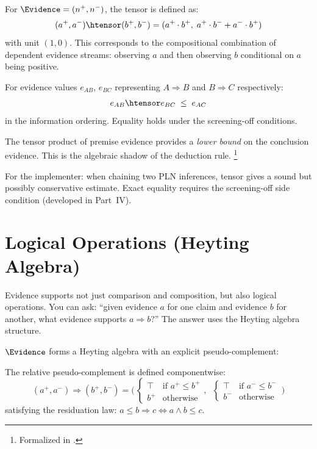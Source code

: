 \documentclass[11pt,openany]{report}
\begin{document}
For $\Evidence = (n^+, n^-)$, the tensor is defined as:
\[
  (a^+, a^-) \htensor (b^+, b^-) = (a^+ \cdot b^+,\; a^+ \cdot b^- + a^- \cdot b^+)
\]
with unit $(1, 0)$.  This corresponds to the compositional combination of
dependent evidence streams: observing $a$ and then observing $b$ conditional
on $a$ being positive.

\begin{theorem}
\label{thm:quantale-trans}
For evidence values $e_{AB}$, $e_{BC}$ representing
$A \Rightarrow B$ and $B \Rightarrow C$ respectively:
\[
  e_{AB} \htensor e_{BC} \;\le\; e_{AC}
\]
in the information ordering.  Equality holds under the screening-off
conditions.
\end{theorem}

\noindent
The tensor product of premise evidence provides a \emph{lower bound} on the
conclusion evidence.  This is the algebraic shadow of the deduction rule.%
\footnote{Formalized in .}

For the implementer: when chaining two PLN inferences, tensor gives a
sound but possibly conservative estimate.  Exact equality requires the
screening-off side condition (developed in Part~IV).

\section{Logical Operations (Heyting Algebra)}

Evidence supports not just comparison and composition, but also logical
operations.  You can ask: ``given evidence $a$ for one claim and evidence
$b$ for another, what evidence supports $a \Rightarrow b$?''  The answer
uses the Heyting algebra structure.

$\Evidence$ forms a Heyting algebra with an explicit
pseudo-complement:

\begin{definition}
The relative pseudo-complement is defined componentwise:
\[
  (a^+, a^-) \Rightarrow (b^+, b^-) =
  \Big(\,\begin{cases} \top & \text{if } a^+ \le b^+ \\
                        b^+ & \text{otherwise}\end{cases},\;\;
        \begin{cases} \top & \text{if } a^- \le b^- \\
                        b^- & \text{otherwise}\end{cases}\,\Big)
\]
satisfying the residuation law:
$a \le b \Rightarrow c \iff a \wedge b \le c$.
\end{definition}
\end{document}
